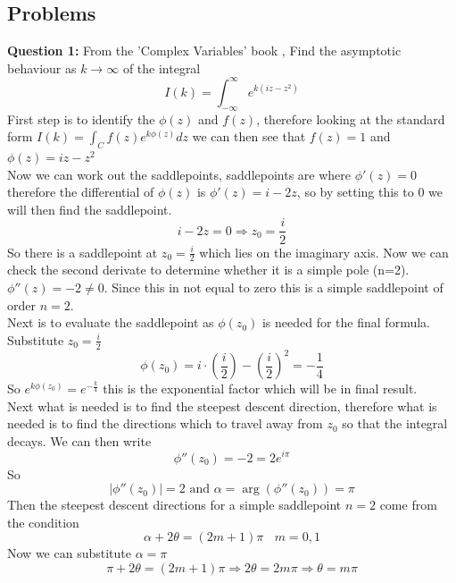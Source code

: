 \subsection{Problems}
\textbf{Question 1:} From the 'Complex Variables' book \cite{RedBook}, Find the asymptotic behaviour as $k\to\infty$ of the integral 
\begin{equation}
    I(k)=\int^{\infty}_{-\infty}e^{k(iz-z^2)}
\end{equation}
First step is to identify the $\phi(z)$ and $f(z)$, therefore looking at the standard form $I(k)=\int_C f(z)e^{k\phi(z)}dz$ we can then see that $f(z)=1$ and $\phi(z)=iz-z^2$ 
\\
Now we can work out the saddlepoints, saddlepoints are where $\phi'(z)=0$ therefore the differential of $\phi(z)$ is $\phi'(z)=i-2z$, so by setting this to 0 we will then find the saddlepoint. $$i-2z=0 \Rightarrow z_0=\frac{i}{2}$$ So there is a saddlepoint at $z_0=\frac{i}{2}$ which lies on the imaginary axis. Now we can check the second derivate to determine whether it is a simple pole (n=2). $\phi''(z)=-2\neq0$. Since this in not equal to zero this is a simple saddlepoint of order $n=2$. 
\\
Next is to evaluate the saddlepoint as $\phi(z_0)$ is needed for the final formula. Substitute $z_0=\frac{i}{2}$ $$\phi(z_0)=i\cdot\left(\frac{i}{2}\right)-\left(\frac{i}{2}\right)^2=-\frac{1}{4}$$ So $e^{k\phi(z_0)}=e^{-\frac{k}{4}}$ this is the exponential factor which will be in final result. 
\\
Next what is needed is to find the steepest descent direction, therefore what is needed is to find the directions which to travel away from $z_0$ so that the integral decays. We can then write 
\begin{equation}
    \phi''(z_0)=-2=2e^{i\pi}
\end{equation}
So 
\begin{equation}
    |\phi''(z_0)|=2 \text{ and } \alpha=\arg(\phi''(z_0))=\pi
\end{equation}
Then the steepest descent directions for a simple saddlepoint $n=2$ come from the condition 
\begin{equation}
    \alpha+2\theta=(2m+1)\pi \ \ \ \ m=0,1
\end{equation}
Now we can substitute $\alpha=\pi$ 
\begin{equation}
    \pi+2\theta=(2m+1)\pi \Rightarrow 2\theta=2m\pi\Rightarrow \theta=m\pi
\end{equation}


